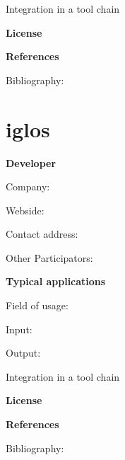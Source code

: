 \documentclass{./template/openetcs2}
\begin{document}



	Integration in a tool chain



	\textbf{License}


	\textbf{References}

	Bibliography:


\section{iglos}

	\textbf{Developer}

	Company: 

	Webside:

	Contact address:

	Other  Participators:



	\textbf{Typical applications}

	Field of usage:


	Input:

	Output:





	Integration in a tool chain



	\textbf{License}


	\textbf{References}

	Bibliography:
\end{document}
